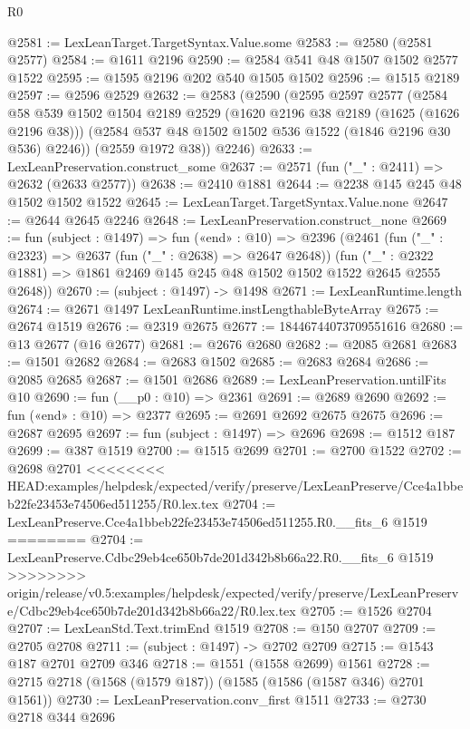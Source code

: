 \begin{lexlean}{R0}
\begin{coremodule}
{{{{{{{{{{{{{{{{{{{{{{{{{{{{{{{{{{{{{{{{{{{{{{{{{{{{{{{{{{{{{{{{{{{{{{{{{@2581 := LexLeanTarget.TargetSyntax.Value.some
@2583 := @2580 (@2581 @2577)
@2584 := @1611 @2196
@2590 := @2584 @541 @48 @1507 @1502 @2577 @1522
@2595 := @1595 @2196 @202 @540 @1505 @1502
@2596 := @1515 @2189
@2597 := @2596 @2529
@2632 := @2583
    (@2590
      (@2595
        @2597
        @2577
        (@2584
          @58
          @539
          @1502
          @1504
          @2189
          @2529
          (@1620 @2196 @38 @2189 (@1625 (@1626 @2196 @38)))
          (@2584 @537 @48 @1502 @1502 @536 @1522 (@1846 @2196 @30 @536) @2246))
        (@2559 @1972 @38))
      @2246)
@2633 := LexLeanPreservation.construct_some
@2637 := @2571 (fun ("_" : @2411) => @2632 (@2633 @2577))
@2638 := @2410 @1881
@2644 := @2238 @145 @245 @48 @1502 @1502 @1522
@2645 := LexLeanTarget.TargetSyntax.Value.none
@2647 := @2644 @2645 @2246
@2648 := LexLeanPreservation.construct_none
@2669 := fun (subject : @1497) =>
  fun («end» : @10) =>
  @2396
    (@2461
      (fun ("_" : @2323) => @2637 (fun ("_" : @2638) => @2647 @2648))
      (fun ("_" : @2322 @1881) => @1861 @2469 @145 @245 @48 @1502 @1502 @1522 @2645 @2555 @2648))
@2670 := (subject : @1497) -> @1498
@2671 := LexLeanRuntime.length
@2674 := @2671 @1497 LexLeanRuntime.instLengthableByteArray
@2675 := @2674 @1519
@2676 := @2319 @2675
@2677 := 18446744073709551616
@2680 := @13 @2677 (@16 @2677)
@2681 := @2676 @2680
@2682 := @2085 @2681
@2683 := @1501 @2682
@2684 := @2683 @1502
@2685 := @2683 @2684
@2686 := @2085 @2685
@2687 := @1501 @2686
@2689 := LexLeanPreservation.untilFits @10
@2690 := fun (__p0 : @10) => @2361
@2691 := @2689 @2690
@2692 := fun («end» : @10) => @2377
@2695 := @2691 @2692 @2675 @2675
@2696 := @2687 @2695
@2697 := fun (subject : @1497) => @2696
@2698 := @1512 @187
@2699 := @387 @1519
@2700 := @1515 @2699
@2701 := @2700 @1522
@2702 := @2698 @2701
<<<<<<<< HEAD:examples/helpdesk/expected/verify/preserve/LexLeanPreserve/Cce4a1bbeb22fe23453e74506ed511255/R0.lex.tex
@2704 := LexLeanPreserve.Cce4a1bbeb22fe23453e74506ed511255.R0.__fits_6 @1519
========
@2704 := LexLeanPreserve.Cdbc29eb4ce650b7de201d342b8b66a22.R0.__fits_6 @1519
>>>>>>>> origin/release/v0.5:examples/helpdesk/expected/verify/preserve/LexLeanPreserve/Cdbc29eb4ce650b7de201d342b8b66a22/R0.lex.tex
@2705 := @1526 @2704
@2707 := LexLeanStd.Text.trimEnd @1519
@2708 := @150 @2707
@2709 := @2705 @2708
@2711 := (subject : @1497) -> @2702 @2709
@2715 := @1543 @187 @2701 @2709 @346
@2718 := @1551 (@1558 @2699) @1561
@2728 := @2715 @2718 (@1568 (@1579 @187)) (@1585 (@1586 (@1587 @346) @2701 @1561))
@2730 := LexLeanPreservation.conv_first @1511
@2733 := @2730 @2718 @344 @2696
}}}}}}}}}}}}}}}}}}}}}}}}}}}}}}}}}}}}}}}}}}}}}}}}}}}}}}}}}}}}}}}}}}}}}}}}}
\end{coremodule}
\end{lexlean}
